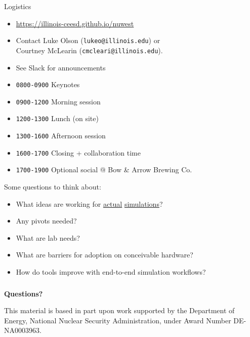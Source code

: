 \documentclass[aspectratio=169]{beamer}
\begin{document}
\begin{frame}{Logistics}
  \begin{itemize}
    \item \url{https://illinois-ceesd.github.io/nuwest}
    \item Contact Luke Olson (\texttt{lukeo@illinois.edu}) or\\
      \hspace{1.25cm} Courtney McLearin (\texttt{cmcleari@illinois.edu}).
    \item See Slack for announcements
    \item {\color{IllinoisOrange} \texttt{0800-0900}} Keynotes
    \item {\color{IllinoisOrange} \texttt{0900-1200}} Morning session
    \item {\color{IllinoisOrange} \texttt{1200-1300}} Lunch (on site)
    \item {\color{IllinoisOrange} \texttt{1300-1600}} Afternoon session
    \item {\color{IllinoisOrange} \texttt{1600-1700}} Closing + collaboration time
    \item {\color{IllinoisOrange} \texttt{1700-1900}} Optional social @ Bow \& Arrow Brewing Co.
  \end{itemize}
\end{frame}

\begin{frame}{Some questions to think about:}
  \begin{itemize}
    \item What ideas are working for \uline{actual} \uline{simulations}?
    \item Any pivots needed?
    \item What are lab needs?
    \item What are barriers for adoption on conceivable hardware?
    \item How do tools improve with end-to-end simulation workflows?
  \end{itemize}
\end{frame}

\begin{frame}\frametitle{}
  \vspace*{0.2in}
  \begin{center}
    \vspace*{0.35in}

    \textbf{\huge\color{IllinoisOrange} Questions?}

    \vspace*{0.5in}
    This material is based in part upon work supported by the Department of Energy,
    National Nuclear Security Administration, under Award Number DE-NA0003963. 
  \end{center}
\end{frame}
\end{document}
